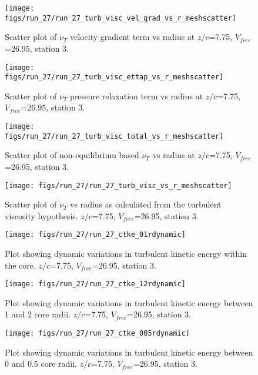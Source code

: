 \begin{figure}[H]
\centering
\texttt{[image: figs/run\_27/run\_27\_turb\_visc\_vel\_grad\_vs\_r\_meshscatter]}
\caption{Scatter plot of $\nu_T$ velocity gradient term vs radius at $z/c$=7.75, $V_{free}$=26.95, station 3.}
\end{figure}


\begin{figure}[H]
\centering
\texttt{[image: figs/run\_27/run\_27\_turb\_visc\_ettap\_vs\_r\_meshscatter]}
\caption{Scatter plot of $\nu_T$ pressure relaxation term vs radius at $z/c$=7.75, $V_{free}$=26.95, station 3.}
\end{figure}


\begin{figure}[H]
\centering
\texttt{[image: figs/run\_27/run\_27\_turb\_visc\_total\_vs\_r\_meshscatter]}
\caption{Scatter plot of non-equilibrium based $\nu_T$ vs radius at $z/c$=7.75, $V_{free}$=26.95, station 3.}
\end{figure}


\begin{figure}[H]
\centering
\texttt{[image: figs/run\_27/run\_27\_turb\_visc\_vs\_r\_meshscatter]}
\caption{Scatter plot of $\nu_T$ vs radius as calculated from the turbulent viscosity hypothesis. $z/c$=7.75, $V_{free}$=26.95, station 3.}
\end{figure}


\begin{figure}[H]
\centering
\texttt{[image: figs/run\_27/run\_27\_ctke\_01rdynamic]}
\caption{Plot showing dynamic variations in turbulent kinetic energy within the core. $z/c$=7.75, $V_{free}$=26.95, station 3.}
\end{figure}


\begin{figure}[H]
\centering
\texttt{[image: figs/run\_27/run\_27\_ctke\_12rdynamic]}
\caption{Plot showing dynamic variations in turbulent kinetic energy between 1 and 2 core radii. $z/c$=7.75, $V_{free}$=26.95, station 3.}
\end{figure}


\begin{figure}[H]
\centering
\texttt{[image: figs/run\_27/run\_27\_ctke\_005rdynamic]}
\caption{Plot showing dynamic variations in turbulent kinetic energy between 0 and 0.5 core radii. $z/c$=7.75, $V_{free}$=26.95, station 3.}
\end{figure}


